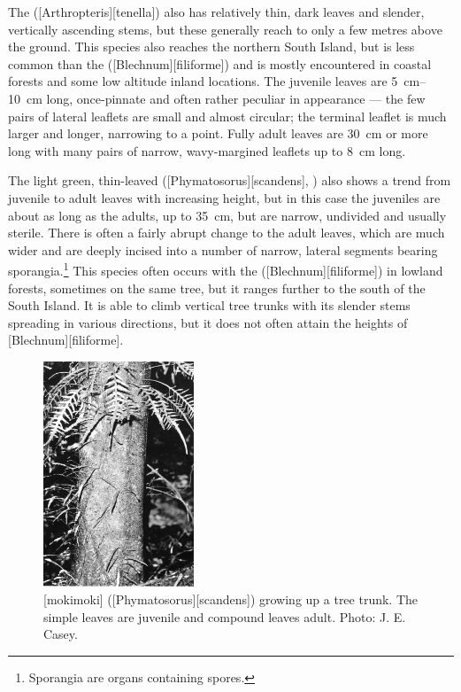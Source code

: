 The  ([Arthropteris][tenella]) also has relatively thin, dark leaves and slender, vertically ascending stems, but these generally reach to only a few metres above the ground.
This species also reaches the northern South Island, but is less common than the  ([Blechnum][filiforme]) and is mostly encountered in coastal forests and some low altitude inland locations.
The juvenile leaves are \SIrange{5}{10}{\centi\metre} long, once-pinnate and often rather peculiar in appearance --- the few pairs of lateral leaflets are small and almost circular; the terminal leaflet is much larger and longer, narrowing to a point.
Fully adult leaves are \SI{30}{\centi\metre} or more long with many pairs of narrow, wavy-margined leaflets up to \SI{8}{\centi\metre} long.

The light green, thin-leaved  ([Phymatosorus][scandens], ) also shows a trend from juvenile to adult leaves with increasing height, but in this case the juveniles are about as long as the adults, up to \SI{35}{\centi\metre}, but are narrow, undivided and usually sterile.
There is often a fairly abrupt change to the adult leaves, which are much wider and are deeply incised into a number of narrow, lateral segments bearing sporangia.\footnote{Sporangia are organs containing spores.}
This species often occurs with the  ([Blechnum][filiforme]) in lowland forests, sometimes on the same tree, but it ranges further to the south of the South Island.
It is able to climb vertical tree trunks with its slender stems spreading in various directions, but it does not often attain the heights of [Blechnum][filiforme].

\begin{figure}
	\includegraphics[width=0.4\textwidth]{graphics/fig_029}
	\centering
	\caption[Mokimoki (\emph{Phymatosorus scandens}) growing up a tree trunk]{[mokimoki] ([Phymatosorus][scandens]) growing up a tree trunk.
The simple leaves are juvenile and compound leaves adult.
	Photo: J. E. Casey.}%
	\label{fig:29scandens}
\end{figure}


